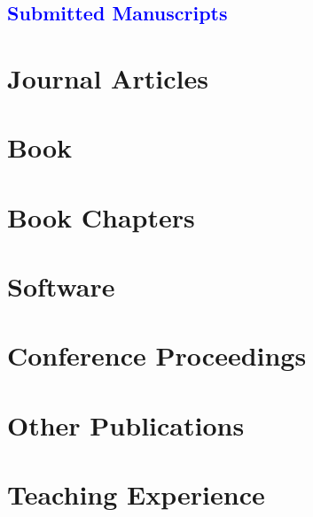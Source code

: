 \documentclass[
  11pt,
  letterpaper,
  DIV=11,
  numbers=noendperiod]{scrartcl}
\begin{document}
\hypertarget{submitted-manuscripts}{%
\subsection{\texorpdfstring{\textcolor{blue}{Submitted
Manuscripts}}{Submitted Manuscripts}}\label{submitted-manuscripts}}

\hypertarget{refs-submitted}{}

\hypertarget{journal-articles}{%
\section{Journal Articles}\label{journal-articles}}

\hypertarget{refs-peer}{}

\hypertarget{book}{%
\section{Book}\label{book}}

\hypertarget{refs-book}{}

\hypertarget{book-chapters}{%
\section{Book Chapters}\label{book-chapters}}

\hypertarget{refs-collection}{}

\hypertarget{software}{%
\section{Software}\label{software}}

\hypertarget{refs-software}{}

\hypertarget{conference-proceedings}{%
\section{Conference Proceedings}\label{conference-proceedings}}

\hypertarget{refs-proceedings}{}

\hypertarget{other-publications}{%
\section{Other Publications}\label{other-publications}}

\hypertarget{refs-misc}{}

\hypertarget{teaching-experience}{%
\section{Teaching Experience}\label{teaching-experience}}
\end{document}
